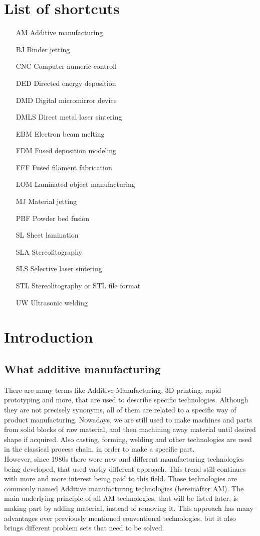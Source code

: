 \documentclass[a4paper, twoside, 11pt]{report}
\begin{document}
\chapter*{List of shortcuts}
\begin{itemize}
\item[AM]Additive manufacturing
\item[BJ]Binder jetting
\item[CNC]Computer numeric controll
\item[DED]Directed energy deposition
\item[DMD]Digital micromirror device
\item[DMLS]Direct metal laser sintering
\item[EBM]Electron beam melting
\item[FDM]Fused deposition modeling
\item[FFF]Fused filament fabrication
\item[LOM]Laminated object manufacturing
\item[MJ]Material jetting
\item[PBF]Powder bed fusion
\item[SL]Sheet lamination
\item[SLA]Stereolitography
\item[SLS]Selective laser sintering
\item[STL]Stereolitography or STL file format
\item[UW]Ultrasonic welding
\end{itemize}


\chapter{Introduction}
%
%
%
\section{What additive manufacturing}
There are many terms like Additive Manufacturing, 3D printing, rapid prototyping and more, that are used to describe specific technologies. Although they are not precisely synonyms, all of them are related to a specific way of product manufacturing. Nowadays, we are still used to make machines and parts from solid blocks of raw material, and then machining away material until desired shape if acquired. Also casting, forming, welding and other technologies are used in the classical process chain, in order to make a specific part.\\
However, since 1980s there were new and different manufacturing technologies being developed, that used vastly different approach. This trend still continues with more and more interest being paid to this field. Those technologies are commonly named Additive manufacturing technologies (hereinafter AM). The main underlying principle of all AM technologies, that will be listed later, is making part by adding material, instead of removing it. This approach has many advantages over previously mentioned conventional technologies, but it also brings different problem sets that need to be solved.
\end{document}
